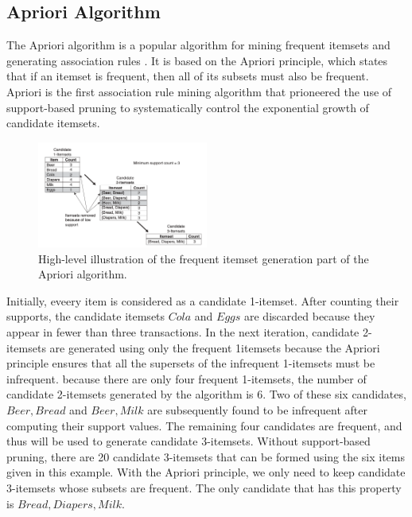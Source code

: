 \documentclass[conference]{IEEEtran}
\begin{document}
\subsection{Apriori Algorithm}
The Apriori algorithm is a popular algorithm for mining frequent itemsets and generating association rules \cite{agrawal1994fast}. It is based on the Apriori principle, which states that if an itemset is frequent, then all of its subsets must also be frequent. \\

Apriori is the first association rule mining algorithm that prioneered the use of support-based pruning to systematically control the exponential growth of candidate itemsets. \\

\begin{figure}[h]
    \centering
    \includegraphics[width=0.5\textwidth]{apriori_algo.png}
    \caption{High-level illustration of the frequent itemset generation part of the Apriori algorithm.}
    \label{fig:apriori_algo}
\end{figure}

Initially, eveery item is considered as a candidate 1-itemset. After counting their supports, the candidate itemsets \( {Cola} \) and \( {Eggs} \) are discarded because they appear in fewer than three transactions. In the next iteration, candidate 2-itemsets are generated using only the frequent 1itemsets because the Apriori principle ensures that all the supersets of the infrequent 1-itemsets must be infrequent. because there are only four frequent 1-itemsets, the number of candidate 2-itemsets generated by the algorithm is 6. Two of these six candidates, 
\( {Beer, Bread} \) and \( {Beer, Milk} \) are subsequently found to be infrequent after computing their support values. The remaining four candidates are frequent, and thus will be used to generate candidate 3-itemsets. Without support-based pruning, there are 20 candidate 3-itemsets that can be formed using the six items given in this example. With the Apriori principle, we only need to keep candidate 3-itemsets whose subsets are frequent. The only candidate that has this property is \( {Bread, Diapers, Milk} \). \\
\end{document}
